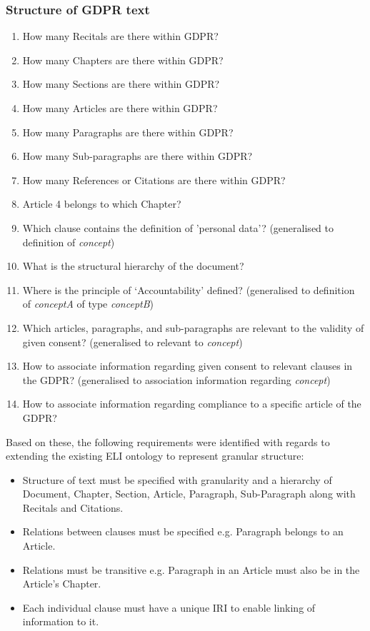 \subsubsection{Structure of GDPR text}
\begin{enumerate}[label={\texttt{CQ.\theenumi}}]
    \item How many Recitals are there within GDPR?
    \item How many Chapters are there within GDPR?
    \item How many Sections are there within GDPR?
    \item How many Articles are there within GDPR?
    \item How many Paragraphs are there within GDPR?
    \item How many Sub-paragraphs are there within GDPR?
    \item How many References or Citations are there within GDPR?
    \item Article 4 belongs to which Chapter?
    \item Which clause contains the definition of 'personal data'? (generalised to definition of \textit{concept})
    \item What is the structural hierarchy of the document?
    \item Where is the principle of `Accountability' defined? (generalised to definition of \textit{conceptA} of type \textit{conceptB})
    \item Which articles, paragraphs, and sub-paragraphs are relevant to the validity of given consent? (generalised to relevant to \textit{concept})
    \item How to associate information regarding given consent to relevant clauses in the GDPR? (generalised to association information regarding \textit{concept})
    \item How to associate information regarding compliance to a specific article of the GDPR?
\end{enumerate}

Based on these, the following requirements were identified with regards to extending the existing ELI ontology to represent granular structure:
\begin{itemize}
    \item Structure of text must be specified with granularity and a hierarchy of Document, Chapter, Section, Article, Paragraph, Sub-Paragraph along with Recitals and Citations.
    \item Relations between clauses must be specified e.g. Paragraph belongs to an Article.
    \item Relations must be transitive e.g. Paragraph in an Article must also be in the Article's Chapter.
    \item Each individual clause must have a unique IRI to enable linking of information to it.
\end{itemize}

